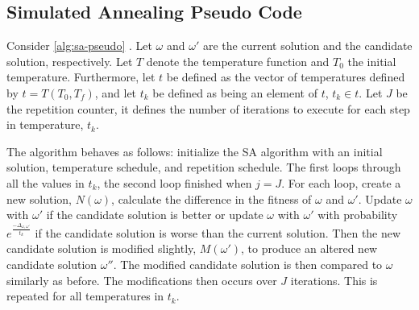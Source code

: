 \documentclass[11pt,a4paper,final]{article}
\newcommand{\Tau}{T}                        %
\begin{document}
\subsection{Simulated Annealing Pseudo Code}
\label{sec:simulated-annealing-pseudo-code}
Consider \ref{alg:sa-pseudo} \cite{henderson-1989-theor-pract}. Let \(\omega\) and \(\omega'\) are the current solution and the
candidate solution, respectively. Let \(\Tau\) denote the temperature function and \(\Tau_0\) the initial temperature.
Furthermore, let \(t\) be defined as the vector of temperatures defined by \(t = \Tau(\Tau_0, \Tau_f)\), and let \(t_k\) be
defined as being an element of \(t\), \(t_k \in t\). Let \(J\) be the repetition counter, it defines the number of iterations to
execute for each step in temperature, \(t_k\).

The algorithm behaves as follows: initialize the SA algorithm with an initial solution, temperature schedule, and
repetition schedule. The first loops through all the values in \(t_k\), the second loop finished when \(j = J\). For each
loop, create a new solution, \(N(\omega)\), calculate the difference in the fitness of \(\omega\) and \(\omega'\). Update \(\omega\) with \(\omega'\) if
the candidate solution is better or update \(\omega\) with \(\omega'\) with probability \(e^{\frac{-\Delta_{\omega , \omega'}}{t_k}}\) if the candidate
solution is worse than the current solution. Then the new candidate solution is modified slightly, \(M(\omega')\), to produce
an altered new candidate solution \(\omega{''}\). The modified candidate solution is then compared to \(\omega\) similarly as before.
The modifications then occurs over \(J\) iterations. This is repeated for all temperatures in \(t_k\).
\end{document}
